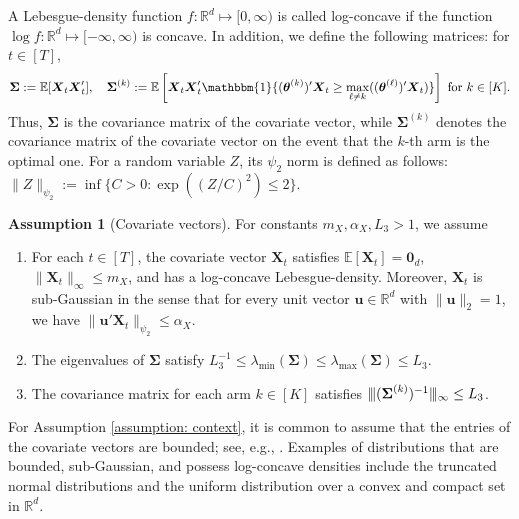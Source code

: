 \documentclass[aos,preprint]{imsart}
\theoremstyle{plain}
\theoremstyle{definition}
\newtheorem{assumption}{Assumption}
\newcommand{\btheta}{\boldsymbol{\theta}}
\newcommand{\bd}[1]{\boldsymbol{#1}}
\newcommand{\idf}{\mathbbm{1}}
\newcommand{\bX}{\boldsymbol{X}}
\newcommand{\bSigma}{\boldsymbol{\Sigma}}
\newcommand{\mn}{\vert\kern-0.25ex \vert\kern-0.25ex \vert}
\newcommand{\lmin}[1]{\lambda_{\min}\left(#1\right)}
\newcommand{\lmax}[1]{\lambda_{\max}\left(#1\right)}
\newcommand{\mR}{\mathbb{R}}
\newcommand{\bu}{\boldsymbol{u}}
\newcommand{\bR}{\mathbb{R}}
\newcommand{\Exp}{\mathbb{E}}
\begin{document}
A Lebesgue-density function $f:\mR^d \mapsto [0,\infty)$ is called log-concave  if the function $\log f:\mR^d \mapsto [-\infty,\infty)$ is concave.
In addition, we define the following matrices: for $t \in [T]$,
\begin{align*}
\bSigma :=\Exp[\bX_t\bX_t'], \quad
    \bSigma^{(k)} := \Exp\left[\bX_t\bX_t'\idf\{(\btheta^{(k)})'\bX_t\ge \max_{\ell \neq k}((\btheta^{(\ell)})'\bX_t)\}\right] \text{ for } k \in [K]. 
\end{align*}
Thus, $\bSigma$ is the covariance matrix of the covariate vector, while $\bSigma^{(k)}$ denotes the covariance matrix of the covariate vector on the event that the $k$-th arm is the optimal one. For a random variable $Z$,  its $\psi_{2}$ norm is defined as follows: $ \|Z\|_{\psi_{2}} := \inf\{C > 0: \exp((Z/C)^2) \leq 2\}$.
 
  
\begin{assumption}[Covariate vectors]\label{assumption: covariates_bandit}
For constants $m_X, \alpha_X, L_3>1$,  we assume
\begin{enumerate}[label={(\alph*)}, ref={\theassumption\ (\alph*)}]
\item \label{assumption: context}
For each $t \in [T]$, the covariate vector $\bX_t$ satisfies $\Exp[\bX_t] = \bd{0}_d$, $\|\bX_t\|_{\infty} \leq m_X$, and has a log-concave Lebesgue-density. Moreover, $\bX_t$ is sub-Gaussian in the sense that for every unit vector $\bu \in \bR^d$ with $\|\bu\|_2 = 1$, we have $\|\bu' \bX_t\|_{\psi_2} \leq \alpha_X$.

 
 
 \item \label{assumption: bounded cov mat}
The eigenvalues of $\bSigma$ satisfy $L_3^{-1}\le \lmin{\bSigma}\le \lmax{\bSigma} \le L_3$.
\item \label{assumption: constraint on the covariance matrix 1}
The covariance matrix for each arm $k\in[K]$ satisfies $\mn(\bSigma^{(k)})^{-1}\mn_{\infty} \le L_3$. 
\end{enumerate}    
\end{assumption}

For Assumption \ref{assumption: context}, it is common to assume that the entries of the covariate vectors are bounded; see, e.g., \cite{bastani2020online, ariu2022thresholded}. 
Examples of distributions that are bounded, sub-Gaussian, and possess log-concave densities include the truncated normal distributions and the uniform distribution over a convex and compact set in $\bR^{d}$.
 
\end{document}
